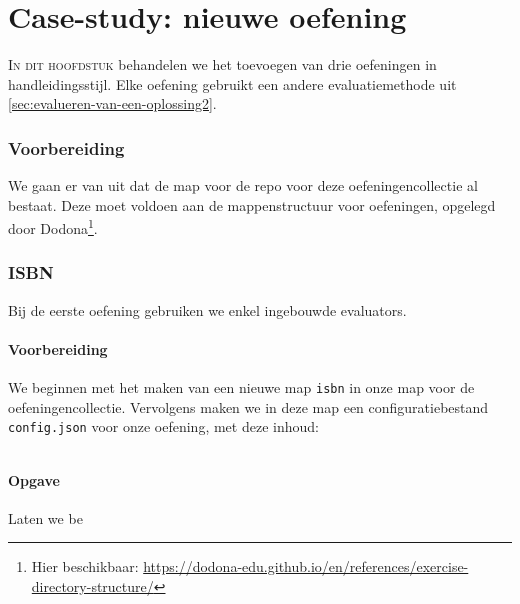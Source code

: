 \chapter{Case-study: nieuwe oefening}\label{ch:nieuwe-oefening}

\lettrine{I}{n dit hoofdstuk} behandelen we het toevoegen van drie oefeningen in handleidingsstijl.
Elke oefening gebruikt een andere evaluatiemethode uit \cref{sec:evalueren-van-een-oplossing2}.

\subsection{Voorbereiding}\label{subsec:voorbereiding}

We gaan er van uit dat de map voor de repo voor deze oefeningencollectie al bestaat.
Deze moet voldoen aan de mappenstructuur voor oefeningen, opgelegd door Dodona\footnote{Hier beschikbaar: \url{https://dodona-edu.github.io/en/references/exercise-directory-structure/}}.

\subsection{ISBN}\label{subsec:isbn}

Bij de eerste oefening gebruiken we enkel ingebouwde evaluators.

\subsubsection{Voorbereiding}

We beginnen met het maken van een nieuwe map \texttt{isbn} in onze map voor de oefeningencollectie.
Vervolgens maken we in deze map een configuratiebestand \texttt{config.json} voor onze oefening, met deze inhoud:

\inputminted{json}{../../exercise/isbn/config.json}

\subsubsection{Opgave}


Laten we be
